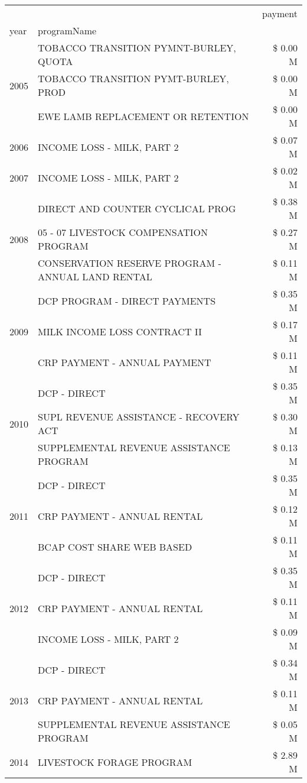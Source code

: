 \begin{tabular}{llr}
\toprule
 &  & payment \\
year & programName &  \\
\midrule
\multirow[t]{3}{*}{2005} & TOBACCO TRANSITION PYMNT-BURLEY, QUOTA & \$ 0.00 M \\
 & TOBACCO TRANSITION PYMT-BURLEY, PROD & \$ 0.00 M \\
 & EWE LAMB REPLACEMENT OR RETENTION & \$ 0.00 M \\
\cline{1-3}
2006 & INCOME LOSS - MILK, PART 2 & \$ 0.07 M \\
\cline{1-3}
2007 & INCOME LOSS - MILK, PART 2 & \$ 0.02 M \\
\cline{1-3}
\multirow[t]{3}{*}{2008} & DIRECT AND COUNTER CYCLICAL PROG & \$ 0.38 M \\
 & 05 - 07 LIVESTOCK COMPENSATION PROGRAM & \$ 0.27 M \\
 & CONSERVATION RESERVE PROGRAM - ANNUAL LAND RENTAL & \$ 0.11 M \\
\cline{1-3}
\multirow[t]{3}{*}{2009} & DCP PROGRAM - DIRECT PAYMENTS & \$ 0.35 M \\
 & MILK INCOME LOSS CONTRACT II & \$ 0.17 M \\
 & CRP PAYMENT - ANNUAL PAYMENT & \$ 0.11 M \\
\cline{1-3}
\multirow[t]{3}{*}{2010} & DCP - DIRECT & \$ 0.35 M \\
 & SUPL REVENUE ASSISTANCE - RECOVERY ACT & \$ 0.30 M \\
 & SUPPLEMENTAL REVENUE ASSISTANCE PROGRAM & \$ 0.13 M \\
\cline{1-3}
\multirow[t]{3}{*}{2011} & DCP - DIRECT & \$ 0.35 M \\
 & CRP PAYMENT - ANNUAL RENTAL & \$ 0.12 M \\
 & BCAP COST SHARE WEB BASED & \$ 0.11 M \\
\cline{1-3}
\multirow[t]{3}{*}{2012} & DCP - DIRECT & \$ 0.35 M \\
 & CRP PAYMENT - ANNUAL RENTAL & \$ 0.11 M \\
 & INCOME LOSS - MILK, PART 2 & \$ 0.09 M \\
\cline{1-3}
\multirow[t]{3}{*}{2013} & DCP - DIRECT & \$ 0.34 M \\
 & CRP PAYMENT - ANNUAL RENTAL & \$ 0.11 M \\
 & SUPPLEMENTAL REVENUE ASSISTANCE PROGRAM & \$ 0.05 M \\
\cline{1-3}
\multirow[t]{3}{*}{2014} & LIVESTOCK FORAGE PROGRAM & \$ 2.89 M \\

\end{tabular}
